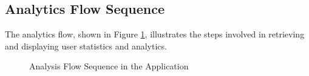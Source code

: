 \subsection{Analytics Flow Sequence}

The analytics flow, shown in Figure \ref{fig:analysis_flow}, illustrates the steps involved in retrieving and displaying user statistics and analytics.

\begin{figure}[ht!]
    \centering
    
    \caption{Analysis Flow Sequence in the Application}
    \label{fig:analysis_flow}
\end{figure}



